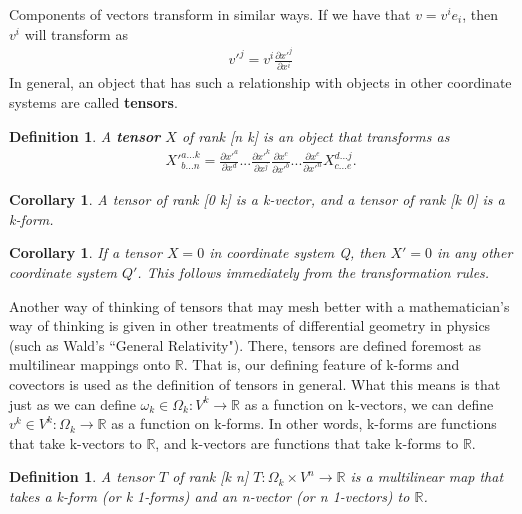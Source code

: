 \documentclass{book}
\newtheorem{defn}[equation]{Definition}
\newtheorem{coro}[equation]{Corollary}
\begin{document}
Components of vectors transform in similar ways. If we have that $v = v^i e_i$, then $v^i$ will transform as \begin{gather}v'^j = v^i \frac{\partial x'^j}{\partial x^i} \end{gather} In general, an object that has such a relationship with objects in other coordinate systems are called \textbf{tensors}. 



\begin{defn}
	A \textbf{tensor} $X$ of rank [n k] is an object that transforms as \begin{gather}X'^{a...k}_{b...n} = \frac{\partial x'^a}{\partial x^d} ... \frac{\partial x'^k}{\partial x^j} \frac{\partial x^c}{\partial x'^b} ... \frac{\partial x^e}{\partial x'^n} X^{d...j}_{c...e}.\end{gather} 
\end{defn}

\begin{coro}
	A tensor of rank [0 k] is a k-vector, and a tensor of rank [k 0] is a k-form. 
\end{coro}



\begin{coro}
	If a tensor $X = 0$ in coordinate system Q, then $X' = 0$ in any other coordinate system $Q'$. This follows immediately from the transformation rules. 
\end{coro}


Another way of thinking of tensors that may mesh better with a mathematician's way of thinking is given in other treatments of differential geometry in physics (such as Wald's ``General Relativity"). There, tensors are defined foremost as multilinear mappings onto $\mathbb{R}$. That is, our defining feature of k-forms and covectors is used as the definition of tensors in general. What this means is that just as we can define $\omega_k \in \Omega_k : V^k \to \mathbb{R}$ as a function on k-vectors, we can define $v^k \in V^k : \Omega_k \to \mathbb{R}$ as a function on k-forms. In other words, k-forms are functions that take k-vectors to $\mathbb{R}$, and k-vectors are functions that take k-forms to $\mathbb{R}$. 

\begin{defn}
	A tensor $T$ of rank [k n] $T: \Omega_k \times V^n \to \mathbb{R}$ is a multilinear map that takes a k-form (or k 1-forms) and an n-vector (or n 1-vectors) to $\mathbb{R}$. 
\end{defn}
\end{document}
